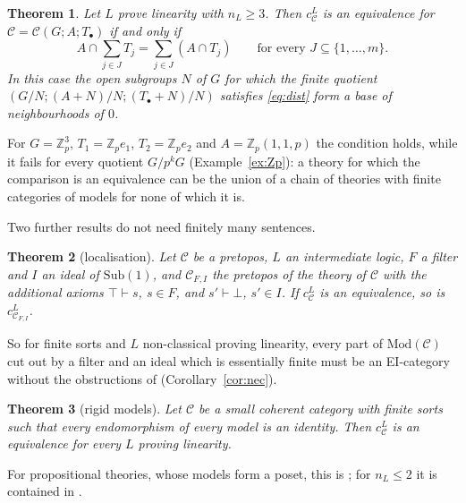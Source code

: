 \documentclass[11pt]{amsart}
\newtheorem{thm}{Theorem}[section]
\theoremstyle{definition}
\newcommand{\Sub}{\mathrm{Sub}}
\newcommand{\Mod}{\mathrm{Mod}}
\newcommand{\cC}{\mathcal C}
\begin{document}
\begin{thm}\label{thm:B}
Let $L$ prove linearity with $n_L\ge3$. Then $c^L_\cC$ is an
equivalence for $\cC=\cC(G;A;T_\bullet)$ if and only if
\begin{equation}\label{eq:dist}
A\cap\sum_{j\in J}T_j=\sum_{j\in J}(A\cap T_j)\qquad\text{for every }
J\subseteq\{1,\dots,m\}.
\end{equation}
In this case the open subgroups $N$ of $G$ for which the finite
quotient $(G/N;(A+N)/N;(T_\bullet+N)/N)$ satisfies \eqref{eq:dist}
form a base of neighbourhoods of $0$.
\end{thm}

For $G=\mathbb Z_p^3$, $T_1=\mathbb Z_pe_1$, $T_2=\mathbb Z_pe_2$ and
$A=\mathbb Z_p(1,1,p)$ the condition holds, while it fails for every
quotient $G/p^kG$ (Example~\ref{ex:Zp}): a theory for which the
comparison is an equivalence can be the union of a chain of theories
with finite categories of models for none of which it is.

Two further results do not need finitely many sentences.

\begin{thm}[localisation]\label{thm:C}
Let $\cC$ be a pretopos, $L$ an intermediate logic, $F$ a filter and
$I$ an ideal of $\Sub(1)$, and $\cC_{F,I}$ the pretopos of the theory
of $\cC$ with the additional axioms $\top\vdash s$, $s\in F$, and
$s'\vdash\bot$, $s'\in I$. If $c^L_\cC$ is an equivalence, so is
$c^L_{\cC_{F,I}}$.
\end{thm}

So for finite sorts and $L$ non-classical proving linearity, every part of
$\Mod(\cC)$ cut out by a filter and an ideal which is essentially
finite must be an EI-category without the obstructions of
\cite{Strings} (Corollary~\ref{cor:nec}).

\begin{thm}[rigid models]\label{thm:D}
Let $\cC$ be a small coherent category with finite sorts such that
every endomorphism of every model is an identity. Then $c^L_\cC$ is an
equivalence for every $L$ proving linearity.
\end{thm}

For propositional theories, whose models form a poset, this is
\cite[Thm.~6.3]{Interm}; for $n_L\le2$ it is contained in
\cite[Thm.~1.1]{Finsorts}.
\end{document}
